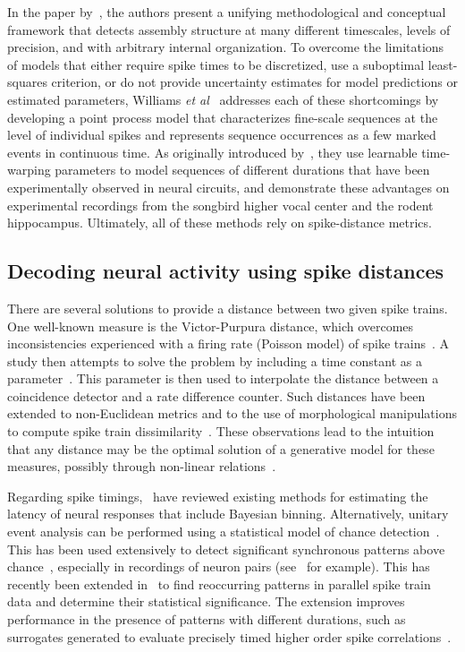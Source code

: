 \documentclass[runningheads]{llncs}
\begin{document}
In the paper by~\cite{russo_cell_2017}, the authors present a unifying methodological and conceptual framework that detects assembly structure at many different timescales, levels of precision, and with arbitrary internal organization. To overcome the limitations of models that either require spike times to be discretized, use a suboptimal least-squares criterion, or do not provide uncertainty estimates for model predictions or estimated parameters, Williams {\it et al}~\cite{williams_point_2020} addresses each of these shortcomings by developing a point process model that characterizes fine-scale sequences at the level of individual spikes and represents sequence occurrences as a few marked events in continuous time. As originally introduced by~\cite{kass_statistical_2005}, they use learnable time-warping parameters to model sequences of different durations that have been experimentally observed in neural circuits, and demonstrate these advantages on experimental recordings from the songbird higher vocal center and the rodent hippocampus. Ultimately, all of these methods rely on spike-distance metrics.
%
\subsection{Decoding neural activity using spike distances}
%
There are several solutions to provide a distance between two given spike trains. One well-known measure is the Victor-Purpura distance, which overcomes inconsistencies experienced with a firing rate (Poisson model) of spike trains~\cite{victor_nature_1996}. A study then attempts to solve the problem by including a time constant as a parameter~\cite{van_rossum_novel_2001}. This parameter is then used to interpolate the distance between a coincidence detector and a rate difference counter. Such distances have been extended to non-Euclidean metrics and to the use of morphological manipulations to compute spike train dissimilarity~\cite{kreuz_measuring_2007}. These observations lead to the intuition that any distance may be the optimal solution of a generative model for these measures, possibly through non-linear relations~\cite{aronov_non-euclidean_2004}. 

Regarding spike timings,~\cite{levakova_review_2015} have reviewed existing methods for estimating the latency of neural responses that include Bayesian binning. Alternatively, unitary event analysis can be performed using a statistical model of chance detection~\cite{grun_unitary_2002-1}. This has been used extensively to detect significant synchronous patterns above chance~\cite{grun_unitary_2010}, especially in recordings of neuron pairs (see~\cite{riehle_spike_1997} for example). This has recently been extended in~\cite{stella_3d-spade_2019} to find reoccurring patterns in parallel spike train data and determine their statistical significance. The extension improves performance in the presence of patterns with different durations, such as surrogates generated to evaluate precisely timed higher order spike correlations~\cite{stella_comparing_2022}.
%
\end{document}
